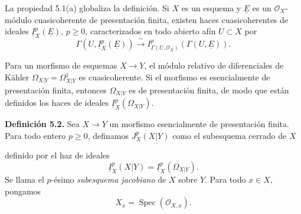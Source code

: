 La propiedad 5.1(a) globaliza la definición. Si $X$ es un esquema y
$\underline E$ es un $\mathcal O_X$-módulo cuasicoherente de
presentación finita, existen haces cuasicoherentes de ideales
$\underline I_X^p(\underline E)$, $p\geq0$, caracterizados en todo
abierto afín $U\subset X$ por
\[
\Gamma(U,\underline I_X^p(\underline E))
\xrightarrow{\ \sim\ }
I_{\Gamma(U,\mathcal O_X)}^p(\Gamma(U,\underline E)).
\]

Para un morfismo de esquemas $X\longrightarrow Y$, el módulo relativo
de diferenciales de K\"ahler
$\Omega_{X|Y}=\Omega^1_{X|Y}$ es cuasicoherente. Si el morfismo es
esencialmente de presentación finita, entonces $\Omega_{X|Y}$ es de
presentación finita, de modo que están definidos los haces de ideales
$\underline I_X^p(\Omega_{X|Y})$.

\medskip
\noindent\textbf{Definición 5.2.}
Sea $X\longrightarrow Y$ un morfismo esencialmente de presentación
finita. Para todo entero $p\geq0$, definamos $J_X^p(X|Y)$ como el
subesquema cerrado de $X$


\noindent definido por el haz de ideales
\[
\underline I_X^p(X|Y)=\underline I_X^p(\Omega_{X|Y}).
\]
Se llama el $p$-ésimo \emph{subesquema jacobiano} de $X$ sobre $Y$.
Para todo $x\in X$, pongamos
\[
X_x=\operatorname{Spec}(\mathcal O_{X,x}).
\]
